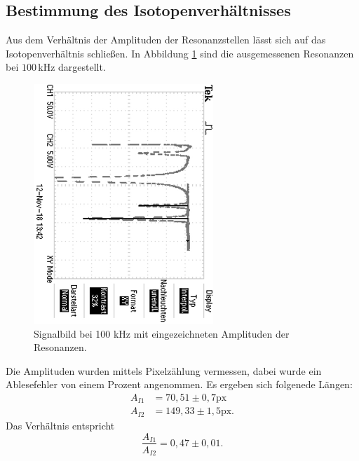 \subsection{Bestimmung des Isotopenverhältnisses}
Aus dem Verhältnis der Amplituden der Resonanzstellen lässt sich auf das Isotopenverhältnis schließen.
In Abbildung \ref{fig:Ampli} sind die ausgemessenen Resonanzen bei $100\,$kHz dargestellt.
\begin{figure}
  \centering
  \includegraphics[angle=90]{pics/VerhltnisAmpli.JPG.png}
  \caption{Signalbild bei 100 kHz mit eingezeichneten Amplituden der Resonanzen.}
  \label{fig:Ampli}
\end{figure}
Die Amplituden wurden mittels Pixelzählung vermessen, dabei wurde ein Ablesefehler von
einem Prozent angenommen. Es ergeben sich folgenede Längen:
\begin{align*}
  A_{I1} &= 70,51 \pm 0,7 \text{px}\\
  A_{I2} &= 149,33 \pm 1,5\text{px} .
\end{align*}
Das Verhältnis entspricht
\begin{equation}
  \frac{A_{I1}}{A_{I2}}= 0,47 \pm 0,01.
\end{equation}
